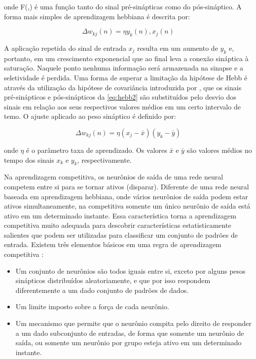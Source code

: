 onde F(,) é uma função tanto do sinal pré-sinápticas como do pós-sináptico. A forma mais simples de aprendizagem hebbiana é descrita por:

\begin{equation} \label{eq:hebb2}
    \Delta w_{kj}(n) = \eta y_{k}(n), x_{j}(n)
\end{equation}

A aplicação repetida do sinal de entrada $x_{j}$ resulta em um aumento de $y_{k}$ e, portanto, em um crescimento exponencial que ao final leva a conexão sináptica à saturação. Naquele ponto nenhuma informação será armazenada na sinapse e a seletividade é perdida. Uma forma de superar a limitação da hipótese de Hebb é através da utilização da hipótese de covariância introduzida por , que os sinais pré-sinápticos e pós-sinápticos da \autoref{eq:hebb2} são substituídos pelo desvio dos sinais em relação aos seus respectivos valores médios em um certo intervalo de temo. O ajuste aplicado ao peso sináptico é definido por:

\begin{equation} \label{eq:hebb2}
    \Delta w_{kj}(n) = \eta(x_{j} - \bar{x})(y_{k} - \bar{y})
\end{equation}

onde $\eta$ é o parâmetro taxa de aprendizado. Os valores $\bar{x}$ e $\bar{y}$ são valores médios no tempo dos sinais $x_{k}$ e $y_{k}$, respectivamente.

Na aprendizagem competitiva, os neurônios de saída de uma rede neural competem entre si para se tornar ativos (disparar). Diferente de uma rede neural baseada em aprendizagem hebbiana, onde vários neurônios de saída podem estar ativos simultaneamente, na competitiva somente um único neurônio de saída está ativo em um determinado instante. Essa característica torna a aprendizagem competitiva muito adequada para descobrir características estatisticamente salientes que podem ser utilizadas para classificar um conjunto de padrões de entrada. Existem três elementos básicos em uma regra de aprendizagem competitiva \cite{rumelhart1985feature}:
    \begin{itemize}
        \item Um conjunto de neurônios são todos iguais entre si, exceto por alguns pesos sinápticos distribuídos aleatoriamente, e que por isso respondem diferentemente a um dado conjunto de padrões de dados.
        \item Um limite imposto sobre a força de cada neurônio.
        \item Um mecanismo que permite que o neurônio compita pelo direito de responder a um dado subconjunto de entradas, de forma que somente um neurônio de saída, ou somente um neurônio por grupo esteja ativo em um determinado instante.
    \end{itemize}
    
